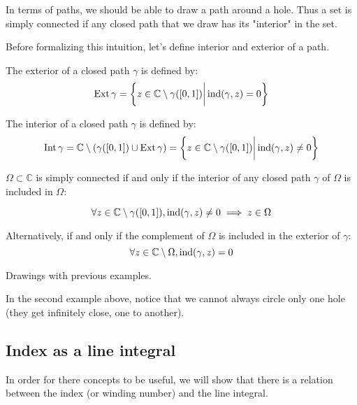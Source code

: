 In terms of paths, we should be able to draw a path around a hole. Thus a set is simply connected if any closed path that we draw has its "interior" in the set.

Before formalizing this intuition, let's define interior and exterior of a path.

\begin{defi}
    The exterior of a closed path $\gamma$ is defined by:
    $$ \operatorname{Ext}\gamma = \left\lbrace z \in \mathbb{C} \setminus \gamma([0,1]) \bigg\vert  \operatorname{ind}(\gamma, z) = 0 \right\rbrace$$
\end{defi}

\begin{defi}
    The interior of a closed path $\gamma$ is defined by:
    $$ \operatorname{Int}\gamma = \mathbb{C} \setminus \left( \gamma([0,1]) \cup \operatorname{Ext}\gamma\right ) = \left\lbrace z \in \mathbb{C} \setminus \gamma([0,1]) \bigg\vert  \operatorname{ind}(\gamma, z) \neq 0 \right\rbrace$$
\end{defi}


\begin{thm*}
    $\Omega\subset\mathbb{C}$ is simply connected if and only if the interior of any closed path $\gamma$ of $\Omega$ is included in $\Omega$:

    $$\forall z \in \mathbb{C}\setminus\gamma([0,1]), \operatorname{ind}(\gamma, z) \neq 0 \implies z \in \Omega $$

Alternatively, if and only if the complement of $\Omega$ is included in the exterior of $\gamma$:
$$\forall z \in \mathbb{C}\setminus\Omega, \operatorname{ind}(\gamma, z) = 0$$
\end{thm*}

\begin{example}
    Drawings with previous examples.
\end{example}

\begin{note}
    In the second example above, notice that we cannot always circle only one hole (they get infinitely close, one to another).
\end{note}

\subsection{Index as a line integral}
In order for there concepts to be useful, we will show that there is a relation between the index (or winding number) and the line integral.

